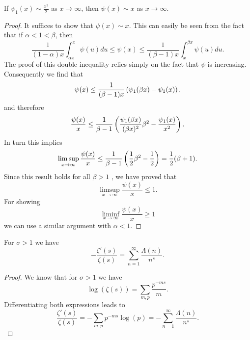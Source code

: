 \begin{lemma}
	If $\psi_1(x) \sim \frac{x^2}{2}$ as $x \to \infty$, then $\psi(x) \sim x$ as $x \to \infty$.
\end{lemma}
\begin{proof}
	It suffices to show that $\psi(x) \sim x$. This can easily be seen from the fact that if $\alpha < 1 < \beta$, then
\begin{equation*}
	\frac{1}{(1 - \alpha) x} \int _{\alpha x} ^x \psi(u) du \leq \psi(x) \leq \frac{1}{(\beta - 1) x} \int _{x} ^{\beta x} \psi(u) du.
\end{equation*}
	The proof of this double inequality relies simply on the fact that $\psi$ is increasing. Consequently we find that
\begin{equation*}
	\psi(x) \leq \frac{1}{(\beta - 1)x} \left(\psi_1(\beta x) - \psi_1(x)\right),
\end{equation*}
	and therefore
\begin{equation*}
	\frac{\psi(x)}{x} \leq \frac{1}{\beta - 1} \left(\frac{\psi_1(\beta x)}{(\beta x)^2} \beta^2 - \frac{\psi_1(x)}{x^2}\right).
\end{equation*}
	In turn this implies
\begin{equation*}
	\limsup _{x \to \infty} \frac{\psi(x)}{x} \leq \frac{1}{\beta - 1} \left(\frac{1}{2} \beta^2 - \frac{1}{2}\right) = \frac{1}{2} (\beta + 1).
\end{equation*}
	Since this result holds for all $\beta > 1$ , we have proved that
\begin{equation*}
	\limsup _{x \to \infty} \frac{\psi(x)}{x} \leq 1. 
\end{equation*}
	For showing
\begin{equation*}
	\liminf _{x \to \infty} \frac{\psi(x)}{x} \geq 1
\end{equation*}
	we can use a similar argument with $\alpha < 1$.
\end{proof}


\begin{lemma}
	For $\sigma > 1$ we have
\begin{equation*}
	-\frac{\zeta'(s)}{\zeta(s)} = \sum _{n = 1} ^\infty \frac{\Lambda(n)}{n^s}.
\end{equation*}
\end{lemma}
\begin{proof}
	We know that for $\sigma > 1$ we have
\begin{equation*}
	\log(\zeta(s)) = \sum _{m,p} \frac{p^{-ms}}{m}.
\end{equation*}
	Differentiating both expressions leads to
\begin{equation*}
	\frac{\zeta'(s)}{\zeta(s)} = -\sum _{m,p} p^{-ms} \log(p) = -\sum _{n = 1} ^\infty \frac{\Lambda(n)}{n^s}.
\end{equation*}
\end{proof}



